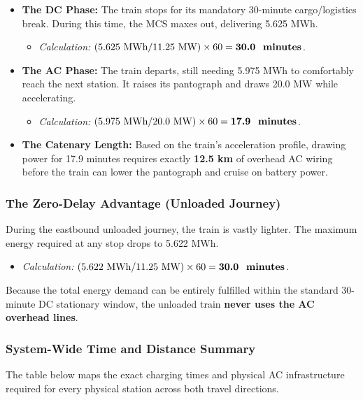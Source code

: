 \begin{itemize}
    \item \textbf{The DC Phase:} The train stops for its mandatory 30-minute cargo/logistics break. During this time, the MCS maxes out, delivering 5.625 MWh. 
    \begin{itemize}
        \item \textit{Calculation:} $(5.625 \text{ MWh} / 11.25 \text{ MW}) \times 60 = \textbf{30.0 \text{ minutes}}$.
    \end{itemize}
    \item \textbf{The AC Phase:} The train departs, still needing 5.975 MWh to comfortably reach the next station. It raises its pantograph and draws 20.0 MW while accelerating.
    \begin{itemize}
        \item \textit{Calculation:} $(5.975 \text{ MWh} / 20.0 \text{ MW}) \times 60 = \textbf{17.9 \text{ minutes}}$.
    \end{itemize}
    \item \textbf{The Catenary Length:} Based on the train's acceleration profile, drawing power for 17.9 minutes requires exactly \textbf{12.5 km} of overhead AC wiring before the train can lower the pantograph and cruise on battery power. 
\end{itemize}

\subsubsection*{The Zero-Delay Advantage (Unloaded Journey)}
During the eastbound unloaded journey, the train is vastly lighter. The maximum energy required at any stop drops to 5.622 MWh. 
\begin{itemize}
    \item \textit{Calculation:} $(5.622 \text{ MWh} / 11.25 \text{ MW}) \times 60 = \textbf{30.0 \text{ minutes}}$.
\end{itemize}
Because the total energy demand can be entirely fulfilled within the standard 30-minute DC stationary window, the unloaded train \textbf{never uses the AC overhead lines}.

\subsubsection*{System-Wide Time and Distance Summary}
The table below maps the exact charging times and physical AC infrastructure required for every physical station across both travel directions. 

